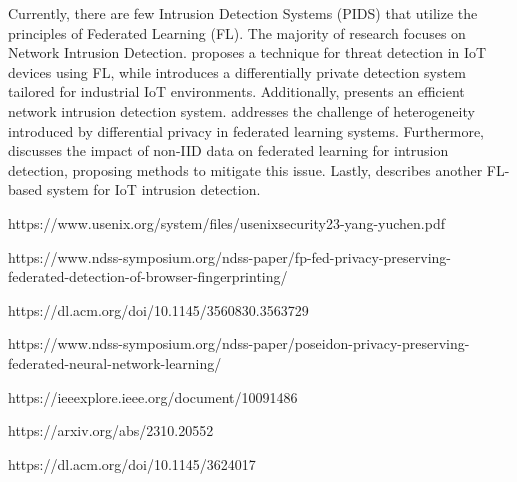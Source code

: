 Currently, there are few Intrusion Detection Systems (PIDS) that utilize the principles of Federated Learning (FL). The majority of research focuses on Network Intrusion Detection. \cite{man2021intelligent} proposes a technique for threat detection in IoT devices using FL, while \cite{friha20232df} introduces a differentially private detection system tailored for industrial IoT environments. Additionally, \cite{li2023efficient} presents an efficient network intrusion detection system. \cite{yang2023privatefl} addresses the challenge of heterogeneity introduced by differential privacy in federated learning systems. Furthermore, \cite{guo2023new} discusses the impact of non-IID data on federated learning for intrusion detection, proposing methods to mitigate this issue. Lastly, \cite{chaabene2023privacy} describes another FL-based system for IoT intrusion detection.


https://www.usenix.org/system/files/usenixsecurity23-yang-yuchen.pdf


https://www.ndss-symposium.org/ndss-paper/fp-fed-privacy-preserving-federated-detection-of-browser-fingerprinting/

https://dl.acm.org/doi/10.1145/3560830.3563729

https://www.ndss-symposium.org/ndss-paper/poseidon-privacy-preserving-federated-neural-network-learning/

https://ieeexplore.ieee.org/document/10091486


https://arxiv.org/abs/2310.20552

https://dl.acm.org/doi/10.1145/3624017


